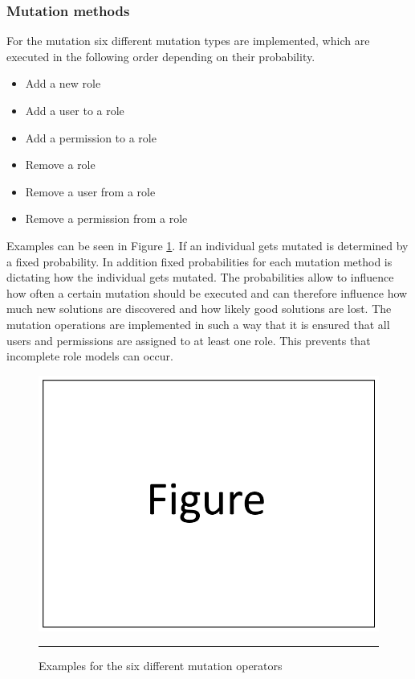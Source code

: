         \subsubsection{Mutation methods}
        For the mutation six different mutation types are implemented, which are executed in the following order depending on their probability.
        \begin{itemize}
            \setlength{\itemsep}{1pt}
            \item Add a new role
            \item Add a user to a role
            \item Add a permission to a role
            \item Remove a role
            \item Remove a user from a role
            \item Remove a permission from a role
        \end{itemize}
        Examples can be seen in Figure \ref{fig:mutationOperations}. If an individual gets mutated is determined by a fixed probability. In addition fixed probabilities for each mutation method is dictating how the individual gets mutated. The probabilities allow to influence how often a certain mutation should be executed and can therefore influence how much new solutions are discovered and how likely good solutions are lost. The mutation operations are implemented in such a way that it is ensured that all users and permissions are assigned to at least one role. This prevents that incomplete role models can occur.
        \begin{figure}
            \centering
            \includegraphics[scale=0.4]{./Figures/dummy.png}
            \rule{20em}{0.5pt}
            \caption{Examples for the six different mutation operators}
            \label{fig:mutationOperations}
        \end{figure}
